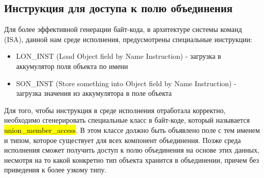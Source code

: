 \subsection{Инструкция для доступа к полю объединения}

Для более эффективной генерации байт-кода, в архитектуре системы команд (ISA), данной нам среде исполнения, предусмотрены
специальные инструкции:

\begin{itemize}[left=2em]
    \item LON\_INST (Load Object field by Name Instruction) - загрузка в аккумулятор поля объекта по имени
    \item SON\_INST (Store something into Object field by Name Instruction) - загрузка значения
    из аккумулятора в поле объекта
\end{itemize}

Для того, чтобы инструкция в среде исполнения отработала корректно, необходимо сгенерировать специальные класс в
байт-коде, который называется \hl{union\_member\_access}.
В этом классе должно быть объявлено поле с тем именем и типом, которое существует для всех компонент объединения.
Позже среда исполнения сможет получить доступ к полю объединения на основе этих данных, несмотря на то
какой конкретно тип объекта хранится в объединении, причем без приведения к более узкому типу.

\newpage
